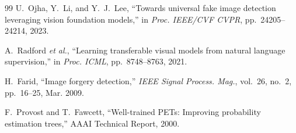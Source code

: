 \documentclass[conference]{IEEEtran}
\begin{document}
\begin{thebibliography}{99}
U.~Ojha, Y.~Li, and Y.~J.~Lee,
``Towards universal fake image detection leveraging vision foundation models,''
in \textit{Proc. IEEE/CVF CVPR}, pp.~24205--24214, 2023.

A.~Radford \textit{et al.},
``Learning transferable visual models from natural language supervision,''
in \textit{Proc. ICML}, pp.~8748--8763, 2021.

H.~Farid,
``Image forgery detection,''
\textit{IEEE Signal Process. Mag.}, vol.~26, no.~2, pp.~16--25, Mar. 2009.

F.~Provost and T.~Fawcett,
``Well-trained PETs: Improving probability estimation trees,''
AAAI Technical Report, 2000.

\end{thebibliography}
\end{document}
